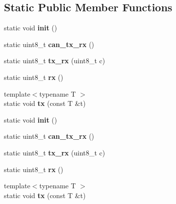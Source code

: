 \subsection*{Static Public Member Functions}
\begin{DoxyCompactItemize}
\item 
\hypertarget{classSpiSync_a07378e5e4ae000daa27ed58b1feeff0e}{}\label{classSpiSync_a07378e5e4ae000daa27ed58b1feeff0e} 
static void {\bfseries init} ()
\item 
\hypertarget{classSpiSync_a224c0b96e99813940a1f28ea1ccf1702}{}\label{classSpiSync_a224c0b96e99813940a1f28ea1ccf1702} 
static uint8\+\_\+t {\bfseries can\+\_\+tx\+\_\+rx} ()
\item 
\hypertarget{classSpiSync_a8506142258c37b77e4b7e9cc3b9cb849}{}\label{classSpiSync_a8506142258c37b77e4b7e9cc3b9cb849} 
static uint8\+\_\+t {\bfseries tx\+\_\+rx} (uint8\+\_\+t c)
\item 
\hypertarget{classSpiSync_a64929149114cd33c268223123b8d3072}{}\label{classSpiSync_a64929149114cd33c268223123b8d3072} 
static uint8\+\_\+t {\bfseries rx} ()
\item 
\hypertarget{classSpiSync_aa964af94bb9f7a91f2a878ea7ca879c5}{}\label{classSpiSync_aa964af94bb9f7a91f2a878ea7ca879c5} 
{\footnotesize template$<$typename T $>$ }\\static void {\bfseries tx} (const T \&t)
\item 
\hypertarget{classSpiSync_a07378e5e4ae000daa27ed58b1feeff0e}{}\label{classSpiSync_a07378e5e4ae000daa27ed58b1feeff0e} 
static void {\bfseries init} ()
\item 
\hypertarget{classSpiSync_a224c0b96e99813940a1f28ea1ccf1702}{}\label{classSpiSync_a224c0b96e99813940a1f28ea1ccf1702} 
static uint8\+\_\+t {\bfseries can\+\_\+tx\+\_\+rx} ()
\item 
\hypertarget{classSpiSync_a8506142258c37b77e4b7e9cc3b9cb849}{}\label{classSpiSync_a8506142258c37b77e4b7e9cc3b9cb849} 
static uint8\+\_\+t {\bfseries tx\+\_\+rx} (uint8\+\_\+t c)
\item 
\hypertarget{classSpiSync_a64929149114cd33c268223123b8d3072}{}\label{classSpiSync_a64929149114cd33c268223123b8d3072} 
static uint8\+\_\+t {\bfseries rx} ()
\item 
\hypertarget{classSpiSync_aa964af94bb9f7a91f2a878ea7ca879c5}{}\label{classSpiSync_aa964af94bb9f7a91f2a878ea7ca879c5} 
{\footnotesize template$<$typename T $>$ }\\static void {\bfseries tx} (const T \&t)
\item 
\hypertarget{classSpiSync_a07378e5e4ae000daa27ed58b1feeff0e}{}\label{classSpiSync_a07378e5e4ae000daa27ed58b1feeff0e} 

\end{DoxyCompactItemize}
